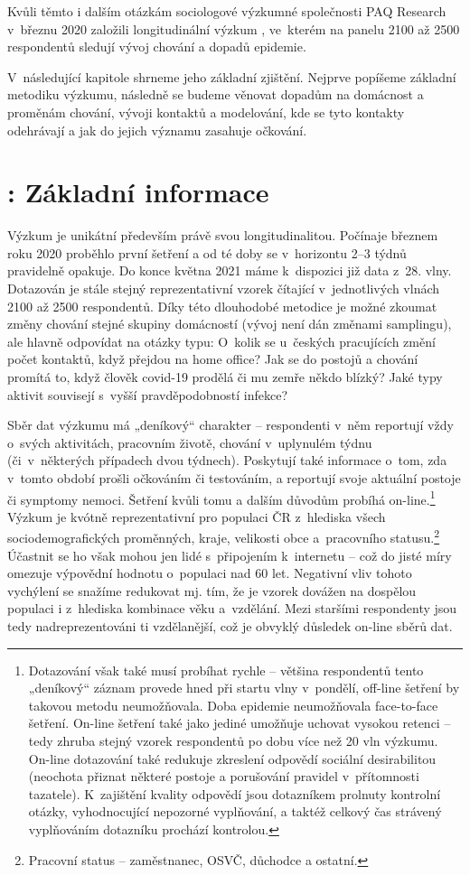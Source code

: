 Kvůli těmto i dalším otázkám sociologové výzkumné společnosti PAQ Research v březnu 2020 založili longitudinální výzkum , ve kterém na panelu 2100 až 2500 respondentů sledují vývoj chování a dopadů epidemie.

V následující kapitole shrneme jeho základní zjištění. Nejprve popíšeme základní metodiku výzkumu, následně se budeme věnovat dopadům na domácnost a proměnám chování, vývoji kontaktů a modelování, kde se tyto kontakty odehrávají a jak do jejich významu zasahuje očkování.

\section*{: Základní informace}

Výzkum je unikátní především právě svou longitudinalitou. Počínaje březnem roku 2020 proběhlo první šetření a od té doby se v horizontu 2–3 týdnů pravidelně opakuje. Do konce května 2021 máme k dispozici již data z 28. vlny. Dotazován je stále stejný reprezentativní vzorek čítající v jednotlivých vlnách 2100 až 2500 respondentů. Díky této dlouhodobé metodice je možné zkoumat změny chování stejné skupiny domácností (vývoj není dán změnami samplingu), ale hlavně odpovídat na otázky typu: O~kolik se u~českých pracujících změní počet kontaktů, když přejdou na home office? Jak se do postojů a chování promítá to, když člověk covid-19 prodělá či mu zemře někdo blízký? Jaké typy aktivit souvisejí s vyšší pravděpodobností infekce?

Sběr dat výzkumu  má „deníkový“ charakter – respondenti v něm reportují vždy o~svých aktivitách, pracovním životě, chování v uplynulém týdnu (či v některých případech dvou týdnech). Poskytují také informace o~tom, zda v tomto období prošli očkováním či testováním, a reportují svoje aktuální postoje či symptomy nemoci. Šetření kvůli tomu a dalším důvodům probíhá on-line.\footnote{Dotazování však také musí probíhat rychle – většina respondentů tento „deníkový“ záznam provede hned při startu vlny v pondělí, off-line šetření by takovou metodu neumožňovala. Doba epidemie neumožňovala face-to-face šetření. On-line šetření také jako jediné umožňuje uchovat vysokou retenci – tedy zhruba stejný vzorek respondentů po dobu více než 20 vln výzkumu. On-line dotazování také redukuje zkreslení odpovědí sociální desirabilitou (neochota přiznat některé postoje a porušování pravidel v přítomnosti tazatele). K~zajištění kvality odpovědí jsou dotazníkem prolnuty kontrolní otázky, vyhodnocující nepozorné vyplňování, a taktéž celkový čas strávený vyplňováním dotazníku prochází kontrolou. } Výzkum je kvótně reprezentativní pro populaci ČR z hlediska všech sociodemografických proměnných, kraje, velikosti obce a pracovního statusu.\footnote{Pracovní status – zaměstnanec, OSVČ, důchodce a ostatní.} Účastnit se ho však mohou jen lidé s~připojením k internetu – což do jisté míry omezuje výpovědní hodnotu o~populaci nad 60 let. Negativní vliv tohoto vychýlení se snažíme redukovat mj. tím, že je vzorek dovážen na dospělou populaci i z hlediska kombinace věku a vzdělání. Mezi staršími respondenty jsou tedy nadreprezentováni ti vzdělanější, což je obvyklý důsledek on-line sběrů dat.

